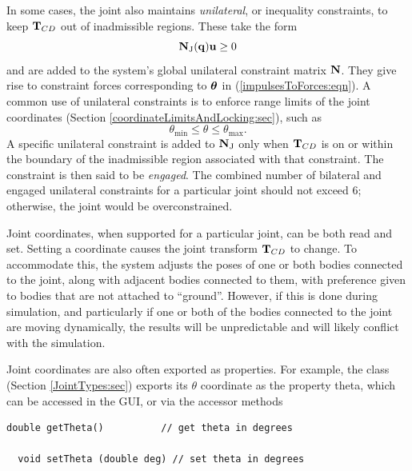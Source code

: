 In some cases, the joint also maintains {\it unilateral}, or inequality
constraints, to keep ${\bf T}_{CD}$ out of inadmissible regions. These take
the form
%
\begin{equation}
{\bf N}_\text{J}({\bf q}) {\bf u} \ge 0
\label{unilateralN:eqn}
\end{equation}
%
and are added to the system's global unilateral constraint matrix
${\bf N}$.  They give rise to constraint forces corresponding to $\boldsymbol\theta$ in
(\ref{impulsesToForces:eqn}). A common use of unilateral constraints
is to enforce range limits of the joint coordinates (Section
\ref{coordinateLimitsAndLocking:sec}), such as
%
\begin{equation}
\theta_{\text{min}} \le \theta \le \theta_{\text{max}}.
\end{equation}
%
A specific unilateral constraint is added to ${\bf N}_\text{J}$ only when
${\bf T}_{CD}$ is on or within the boundary of the inadmissible region
associated with that constraint. The constraint is then said to be
{\it engaged}. The combined number of bilateral and engaged unilateral
constraints for a particular joint should not exceed 6; otherwise, the
joint would be overconstrained.

Joint coordinates, when supported for a particular joint, can be both
read and set. Setting a coordinate causes the joint transform
${\bf T}_{CD}$ to change. To accommodate this, the system adjusts the poses
of one or both bodies connected to the joint, along with adjacent
bodies connected to them, with preference given to bodies that are not
attached to ``ground''.  However, if this is done during simulation,
and particularly if one or both of the bodies connected to the joint
are moving dynamically, the results will be unpredictable and will
likely conflict with the simulation.

Joint coordinates are also often exported as properties. For example,
the
class (Section \ref{JointTypes:sec}) exports its $\theta$ coordinate
as the property {\sf theta}, which can be accessed in the GUI, or via
the accessor methods
\begin{lstlisting}[]
  double getTheta()          // get theta in degrees

  void setTheta (double deg) // set theta in degrees
\end{lstlisting}
%

